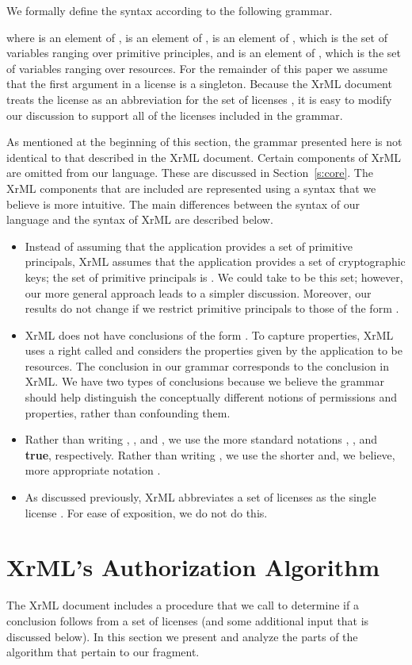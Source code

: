 \documentclass{acmtrans2m}
\newcommand{\<}{
}
\renewcommand{\>}{\rangle}
\begin{document}
We formally define the syntax according to the following grammar.

where  is an element of ,  is an element of
,  is an element of , which is the set of variables
ranging over primitive principles, and  is an element of , which is the
set of variables ranging over resources.  For the remainder of this paper we assume that the first
argument in a license is a singleton.  Because the XrML document treats the license
 as an abbreviation for the set of licenses
, it is easy to modify our discussion to support all of the
licenses included in the grammar.

As mentioned at the beginning of this section, the grammar presented
here is not
identical to that described in the XrML document.  Certain components of XrML are
omitted from our language.  These are discussed in Section~\ref{s:core}.  The XrML
components that are included are represented using a syntax that we believe is more
intuitive.  The main differences between the syntax of our language and the syntax
of XrML are described below.
\begin{itemize}
\item Instead of assuming that the application provides a set of primitive principals, XrML assumes
that the application provides a set  of cryptographic keys; the set of primitive principals is
. We could take  to be this set; however, our more
general approach leads to a simpler discussion.  Moreover, our results do not change if we restrict
primitive principals to those of the form .
\item XrML does not have conclusions of the form .  To capture properties, XrML uses a right
called  and considers the properties given by the application to be resources.  The
conclusion  in our grammar corresponds to the conclusion
 in XrML.  We have two types of conclusions because we believe
the grammar should help distinguish the conceptually different notions of permissions and properties,
rather than confounding them.
\item Rather than writing , , and
, we use the more standard notations , ,
and {\bf true}, respectively.  Rather than writing
, we use the shorter and, we believe, more appropriate notation
.
\item As discussed previously, XrML abbreviates a set of licenses
 as the single license
.  For ease of exposition, we do not do this.
\end{itemize}

\section{XrML's Authorization Algorithm}\label{s:xrmlAlg}
The XrML document includes a procedure that we call  to determine if a conclusion follows from
a set of licenses (and some additional input that is discussed below).  In this section we present and
analyze the parts of the algorithm that pertain to our fragment.
\end{document}
